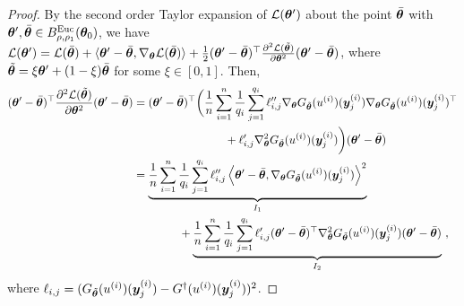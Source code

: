\RSS*
\begin{proof}
By the second order Taylor expansion of ${\mathcal{L}}({\bm{\theta}}^\prime)$ about the point $\bar{{\bm{\theta}}}$ with ${\bm{\theta}}^\prime,\bar{{\bm{\theta}}}\in B^{\mathrm{Euc}}_{\rho,\rho_1}({\bm{\theta}}_0)$, we have
${\cal L}({\bm{\theta}}') = {\cal L}(\bar{{\bm{\theta}}}) + \langle {\bm{\theta}}' - \bar{{\bm{\theta}}}, \nabla_{\bm{\theta}}{\cal L}(\bar{{\bm{\theta}}}) \rangle + \frac{1}{2} ({\bm{\theta}}'-\bar{{\bm{\theta}}})^\top \frac{\partial^2 {\cal L}(\tilde{{\bm{\theta}}})}{\partial {\bm{\theta}}^2} ({\bm{\theta}}'-\bar{{\bm{\theta}}})$, 
where $\tilde{{\bm{\theta}}} = \xi {\bm{\theta}}' + (1-\xi) \bar{{\bm{\theta}}}$ for some $\xi \in [0,1]$. Then, 
\begin{align*}
    ({\bm{\theta}}'-\bar{{\bm{\theta}}})^\top \frac{\partial^2 {\cal L}(\tilde{{\bm{\theta}}})}{\partial {\bm{\theta}}^2} ({\bm{\theta}}'-\bar{{\bm{\theta}}}) 
    & = ({\bm{\theta}}'-\bar{{\bm{\theta}}})^\top \bigg( \frac{1}{n} \sum_{i=1}^n \frac{1}{q_i} \sum_{j=1}^{q_i}  \ell^{\prime\prime}_{i,j} \nabla_{{\bm{\theta}}} G_{\tilde{{\bm{\theta}}}}(u^{(i)})({\bm{y}}^{(i)}_j) \nabla_{{\bm{\theta}}} G_{\tilde{{\bm{\theta}}}}(u^{(i)})({\bm{y}}^{(i)}_j)^\top  \\
    & \qquad \qquad \qquad \qquad + \ell^{\prime}_{i,j}   \nabla^2_{{\bm{\theta}}} G_{\tilde{{\bm{\theta}}}}(u^{(i)})({\bm{y}}^{(i)}_j)  \bigg)  ({\bm{\theta}}'-\bar{{\bm{\theta}}}) \\
    & = \underbrace{\frac{1}{n} \sum_{i=1}^n  \frac{1}{q_i} \sum_{j=1}^{q_i} \ell^{\prime\prime}_{i,j} \left\langle {\bm{\theta}}'-\bar{{\bm{\theta}}}, \nabla_{{\bm{\theta}}} G_{\tilde{{\bm{\theta}}}}(u^{(i)})({\bm{y}}^{(i)}_j) \right\rangle^2}_{I_1} \\
    & \qquad \qquad + \underbrace{\frac{1}{n} \sum_{i=1}^n \frac{1}{q_i} \sum_{j=1}^{q_i} \ell^{\prime}_{i,j}  ({\bm{\theta}}'-\bar{{\bm{\theta}}})^\top \nabla^2_{{\bm{\theta}}} G_{\tilde{{\bm{\theta}}}}(u^{(i)})({\bm{y}}^{(i)}_j)  ({\bm{\theta}}'-\bar{{\bm{\theta}}}) }_{I_2}~,
\end{align*}
where $\ell_{i,j}=(G_{\tilde{{\bm{\theta}}}}(u^{(i)})({\bm{y}}_{j}^{(i)})-G^\dagger(u^{(i)})({\bm{y}}^{(i)}_j))^2$. 


\end{proof}
